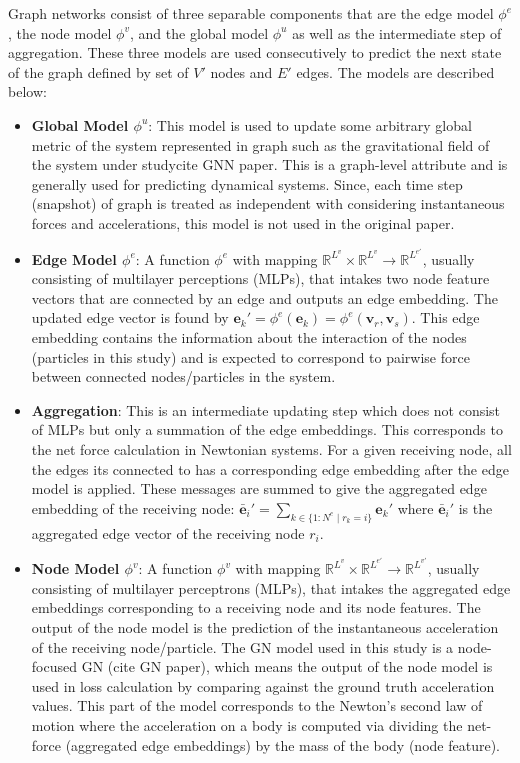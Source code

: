 \documentclass{article}
\begin{document}
Graph networks consist of three separable components that are the edge model $\phi^e$, the node model $\phi^v$, and the global model $\phi^u$ as well as the intermediate step of aggregation. These three models are used consecutively to predict the next state of the graph defined by set of  $V'$ nodes and $E'$ edges. The models are described below:

\begin{itemize}
    \item \textbf{Global Model $\phi^u$}: This model is used to update some arbitrary global metric of the system represented in graph such as the gravitational field of the system under study{cite GNN paper}. This is a graph-level attribute and is generally used for predicting dynamical systems. Since, each time step (snapshot) of graph is treated as independent with considering instantaneous forces and accelerations, this model is not used in the original paper.
    \item \textbf{Edge Model $\phi^e$}: A function $\phi^e$ with mapping $\mathbb{R}^{L^v} \times \mathbb{R}^{L^v} \to \mathbb{R}^{L^{e'}}$, usually consisting of multilayer perceptions (MLPs), that intakes two node feature vectors that are connected by an edge and outputs an edge embedding. The updated edge vector is found by $\textbf{e}_k' = \phi^e(\textbf{e}_k) = \phi^e(\textbf{v}_r, \textbf{v}_s)$. This edge embedding contains the information about the interaction of the nodes (particles in this study) and is expected to correspond to pairwise force between connected nodes/particles in the system.
    \item \textbf{Aggregation}: This is an intermediate updating step which does not consist of MLPs but only a summation of the edge embeddings. This corresponds to the net force calculation in Newtonian systems. For a given receiving node, all the edges its connected to has a corresponding edge embedding after the edge model is applied. These messages are summed to give the aggregated edge embedding of the receiving node: $\bar{\textbf{e}}_i' = \sum_{k \in \{1:N^e \mid r_k = i\}} \textbf{e}_k'$ where $\bar{\textbf{e}}_i'$ is the aggregated edge vector of the receiving node $r_i$. 
    \item \textbf{Node Model $\phi^v$}: A function $\phi^v$ with mapping $\mathbb{R}^{L^v} \times \mathbb{R}^{L^{e'}} \to \mathbb{R}^{L^{v'}}$, usually consisting of multilayer perceptrons (MLPs), that intakes the aggregated edge embeddings corresponding to a receiving node and its node features. The output of the node model is the prediction of the instantaneous acceleration of the receiving node/particle. The GN model used in this study is a node-focused GN (cite GN paper), which means the output of the node model is used in loss calculation by comparing against the ground truth acceleration values. This part of the model corresponds to the Newton's second law of motion where the acceleration on a body is computed via dividing the net-force (aggregated edge embeddings) by the mass of the body (node feature).
\end{itemize}
\end{document}
